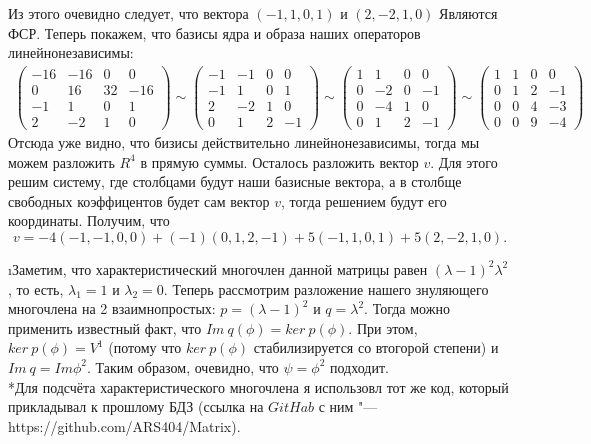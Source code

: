 Из этого очевидно следует, что вектора $(-1, 1, 0, 1)$ и $(2, -2, 1, 0)$ Являются ФСР. Теперь покажем, что базисы ядра и образа наших операторов линейнонезависимы:
\begin{gather*}
    \begin{pmatrix}
        -16 & -16 & 0 & 0\\
        0 & 16 & 32 & -16\\
        -1 & 1 & 0 & 1\\
        2 & -2 & 1 & 0
    \end{pmatrix} \sim 
    \begin{pmatrix}
        -1 & -1 & 0 & 0\\
        -1 & 1 & 0 & 1\\
        2 & -2 & 1 & 0\\
        0 & 1 & 2 & -1
    \end{pmatrix} \sim
    \begin{pmatrix}
        1 & 1 & 0 & 0\\
        0 & -2 & 0 & -1\\
        0 & -4 & 1 & 0\\
        0 & 1 & 2 & -1
    \end{pmatrix} \sim
    \begin{pmatrix}
        1 & 1 & 0 & 0\\
        0 & 1 & 2 & -1\\
        0 & 0 & 4 & -3\\
        0 & 0 & 9 & -4
    \end{pmatrix}
\end{gather*}
Отсюда уже видно, что бизисы действительно линейнонезависимы, тогда мы можем разложить $R^4$ в прямую суммы. Осталось разложить вектор $v$. Для этого решим систему, где столбцами будут наши базисные вектора, а в столбще свободных коэффицентов будет сам вектор $v$, тогда решением будут его координаты. Получим, что $$v = -4(-1, -1, 0, 0) + (-1)(0, 1, 2, -1) + 5(-1, 1, 0, 1) + 5(2, -2, 1, 0).$$

\i Заметим, что характеристический многочлен данной матрицы равен $(\lambda-1)^2\lambda^2$, то есть, $\lambda_1 = 1$ и $\lambda_2 = 0$. Теперь рассмотрим разложение нашего знуляющего многочлена на 2 взаимнопростых: $p = (\lambda - 1)^2$ и $q = \lambda^2$. Тогда можно применить известный факт, что $Im\ q(\phi) = ker\ p(\phi)$. При этом, $ker\ p(\phi) = V^1$ (потому что $ker\ p(\phi)$ стабилизируется со втогорой степени) и $Im\ q = Im \phi^2$. Таким образом, очевидно, что $\psi = \phi^2$ подходит.\\
*Для подсчёта характеристического многочлена я использовл тот же код, который прикладывал к прошлому БДЗ (ссылка на $GitHab$ с ним "--- https://github.com/ARS404/Matrix).

